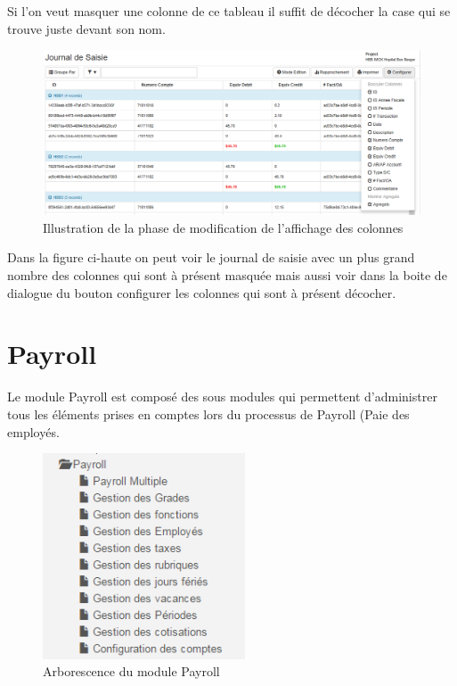 \documentclass[12pt,a4paper]{report}
\begin{document}
Si l'on veut masquer une colonne de ce tableau il suffit de décocher la case qui se trouve juste devant son nom.
\begin{figure}[h]
\begin{center}
\includegraphics[width=12cm]{pic/MenuConfigurationAction.png}
\end{center}
\caption{Illustration de la phase de modification de l'affichage des colonnes}
\label{Illustration de la phase de modification de l'affichage des colonnes}
\end{figure}

Dans la figure ci-haute on peut voir le journal de saisie avec un plus grand nombre des colonnes qui sont à présent masquée mais aussi voir dans la boite de dialogue du bouton configurer les colonnes qui sont à présent décocher.


\newpage
\chapter{Payroll}        
Le module Payroll est composé des sous modules qui permettent d'administrer tous les éléments prises en comptes lors du processus de Payroll (Paie des employés.

\begin{figure}[h]
\begin{center}
\includegraphics[width=6cm]{pic/PayrollArbo.png}
\end{center}
\caption{Arborescence du module Payroll}
\label{Arborescence du module Payroll}
\end{figure}
\end{document}
